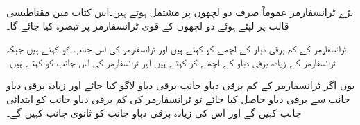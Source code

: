 بڑے ٹرانسفارمر عموماً صرف دو لچھوں پر مشتمل ہوتے ہیں۔اس کتاب میں مقناطیسی قالب پر لپٹے ہوئے دو لچھوں کے  قوی ٹرانسفارمر پر تبصرہ کیا جائے گا۔

ٹرانسفارمر کے کم برقی دباو کے لچھے کو   کہتے ہیں اور ٹرانسفارمر کی اس جانب کو   کہتے ہیں جبکہ ٹرانسفارمر کے زیادہ برقی دباو کے لچھے کو   کہتے ہیں اور ٹرانسفارمر کی اس جانب کو   کہتے ہیں۔

یوں اگر ٹرانسفارمر کے کم برقی دباو  جانب برقی دباو لاگو کیا جائے اور زیادہ برقی دباو  جانب سے برقی دباو حاصل کیا جائے تو ٹرانسفارمر کی کم برقی دباو  جانب کو ابتدائی جانب کہیں گے اور اس کی زیادہ برقی دباو  جانب کو ثانوی جانب کہیں گے۔

